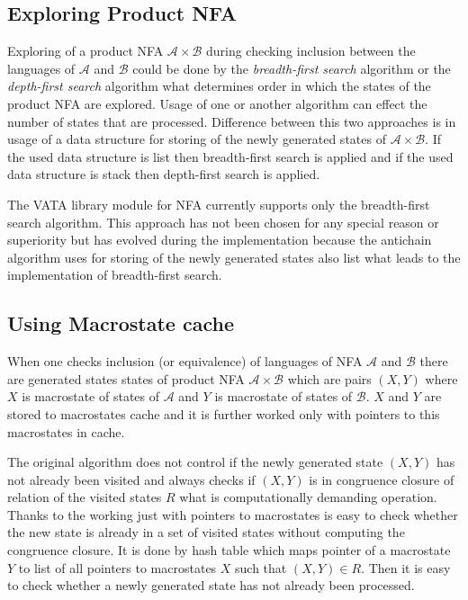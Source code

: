 \subsection{Exploring Product NFA}
Exploring of a product NFA $\mathcal{A}\times\mathcal{B}$ during checking inclusion between the languages of $\mathcal{A}$ and $\mathcal{B}$ could be done by 
the \emph{breadth-first search} \cite{taocp} algorithm or the \emph{depth-first search} \cite{taocp} algorithm what
determines order in which the states of the product NFA are explored. Usage of one or another algorithm can effect the number of states that are processed. 
Difference between this two approaches is in usage of a data structure for storing of the newly generated states of $\mathcal{A}\times\mathcal{B}$.
If the used data structure is list then breadth-first search is applied and if the used data structure is stack then 
depth-first search is applied.

The VATA library module for NFA currently supports only the breadth-first search algorithm. This approach has not been chosen for any special reason or superiority
but has evolved during the implementation because the antichain algorithm uses for storing of 
the newly generated states also list what leads to the implementation of breadth-first search.


\subsection{Using Macrostate cache}
When one checks inclusion (or equivalence) of languages of NFA $\mathcal{A}$ and $\mathcal{B}$ there are generated states states of product NFA $\mathcal{A}
\times \mathcal{B}$ which are pairs $(X,Y)$ where $X$ is macrostate of states of $\mathcal{A}$ and $Y$ is macrostate of states of $\mathcal{B}$. $X$ and $Y$
are stored to macrostates cache and it is further worked only with pointers to this macrostates in cache.

The original algorithm does not control if the newly generated state $(X,Y)$ has not already been visited and always checks if $(X,Y)$ is in
congruence closure of relation of the visited states $R$  what is
computationally demanding operation. Thanks to the working just with pointers to macrostates is easy to check whether the new state is already in a set of 
visited states without computing the congruence closure. It is done by hash table which maps pointer of a macrostate $Y$ to list of all
pointers to macrostates $X$ such that $(X,Y)\in R$. Then it is easy to check whether a newly generated state has not already been processed. 

